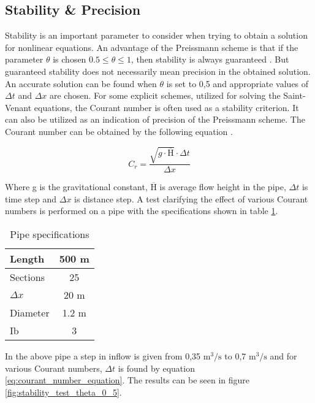 \subsection{Stability \& Precision} \label{subse:stability_and_precision}

Stability is an important parameter to consider when trying to obtain a solution for nonlinear equations. 
An advantage of the Preissmann scheme is that if the parameter $\theta$ is chosen $0.5 \leq \theta \leq 1$, then stability is always guaranteed \cite{cunge1980practical}. But guaranteed stability does not necessarily mean precision in the obtained solution. An accurate solution can be found when $\theta$ is set to 0,5 and appropriate values of $\Delta t$ and $\Delta x$ are chosen. For some explicit schemes, utilized for solving the Saint-Venant equations, the Courant number is often used as a stability criterion. It can also be utilized as an indication of precision of the Preissmann scheme. The Courant number can be obtained by the following equation \cite{cunge1980practical,szymkiewicz2010numerical}.

\begin{equation} \label{eq:courant_number_equation}
	C_r =  \frac{\sqrt{g \cdot \overline{\text{H}}} \cdot \Delta t}{\Delta x}
\end{equation}

Where g is the gravitational constant, $\overline{\text{H}}$ is average flow height in the pipe, $\Delta t$ is time step and $\Delta x$ is distance step. A test clarifying the effect of various Courant numbers is performed on a pipe with the specifications shown in table \ref{tab:pipe_stability_test}.

\begin{table}[H]
\centering
\begin{tabular}{|l|c|}  \hline
Length  	& 500 m \\ \hline
Sections 	& 25  	\\ \hline
$\Delta x$	& 20 m  \\ \hline
Diameter	& 1.2 m \\ \hline
Ib			& 3 \textperthousand \\ \hline
\end{tabular}
\caption{Pipe specifications}
\label{tab:pipe_stability_test}
\end{table}

In the above pipe a step in inflow is given from 0,35 $\text{m}^\text{3}/ \text{s}$ to 0,7 $\text{m}^\text{3}/ \text{s}$ and for various Courant numbers, $\Delta t$ is found by equation \ref{eq:courant_number_equation}. The results can be seen in figure \ref{fig:stability_test_theta_0_5}. 


